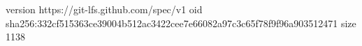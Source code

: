 version https://git-lfs.github.com/spec/v1
oid sha256:332cf515363ce39004b512ac3422cee7e66082a97c3c65f78f9f96a903512471
size 1138
